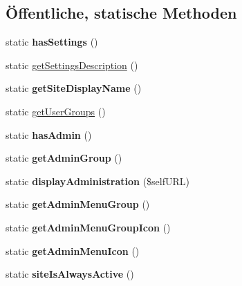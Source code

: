 \subsection*{Öffentliche, statische Methoden}
\begin{DoxyCompactItemize}
\item 
\mbox{\label{classdigital_signage_websites_aa6a7995b7081bcb12df3e85bfc57bb6b}} 
static {\bfseries has\+Settings} ()
\item 
static \mbox{\hyperlink{classdigital_signage_websites_a2b4b606d00b40b3fc3682a3543363b29}{get\+Settings\+Description}} ()
\item 
\mbox{\label{classdigital_signage_websites_a84ab26bcaede4770a86cb0ad3783b8f9}} 
static {\bfseries get\+Site\+Display\+Name} ()
\item 
static \mbox{\hyperlink{classdigital_signage_websites_a6a5fc836a518d67a481a3d64b4ab2005}{get\+User\+Groups}} ()
\item 
\mbox{\label{classdigital_signage_websites_a128d0bb95bca00eb35516785333a6ec7}} 
static {\bfseries has\+Admin} ()
\item 
\mbox{\label{classdigital_signage_websites_ac8b665808fe13342635ebc6797b1834d}} 
static {\bfseries get\+Admin\+Group} ()
\item 
\mbox{\label{classdigital_signage_websites_a425bfe00f1b6279df879ef76a18e69e7}} 
static {\bfseries display\+Administration} (\$self\+U\+RL)
\item 
\mbox{\label{classdigital_signage_websites_a3c24026d8038a5dd605977c33bb7d6fd}} 
static {\bfseries get\+Admin\+Menu\+Group} ()
\item 
\mbox{\label{classdigital_signage_websites_aa8b581799a4307b1099383ef0541b3f9}} 
static {\bfseries get\+Admin\+Menu\+Group\+Icon} ()
\item 
\mbox{\label{classdigital_signage_websites_ad9a0cac7934e38347642e58b14c623cd}} 
static {\bfseries get\+Admin\+Menu\+Icon} ()
\item 
\mbox{\label{classdigital_signage_websites_a758039203e6dbfe5b5441c36280aceac}} 
static {\bfseries site\+Is\+Always\+Active} ()
\end{DoxyCompactItemize}
